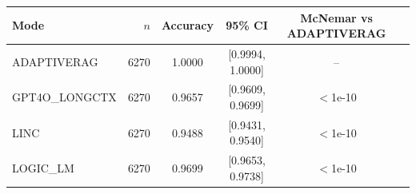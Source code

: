 \begin{tabular}{lrcccc}
\toprule
Mode & $n$ & Accuracy & 95\% CI & McNemar vs ADAPTIVERAG \\
\midrule
ADAPTIVERAG & 6270 & 1.0000 & [0.9994, 1.0000] & -- \\
GPT4O\_LONGCTX & 6270 & 0.9657 & [0.9609, 0.9699] & $<$1e-10 \\
LINC & 6270 & 0.9488 & [0.9431, 0.9540] & $<$1e-10 \\
LOGIC\_LM & 6270 & 0.9699 & [0.9653, 0.9738] & $<$1e-10 \\
\bottomrule
\end{tabular}